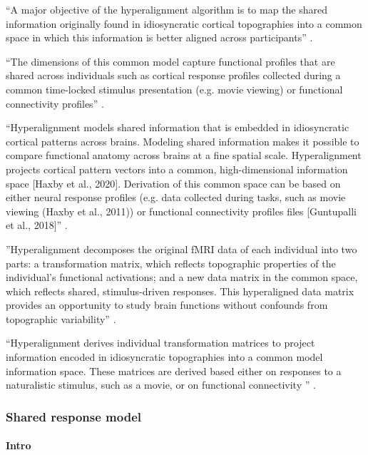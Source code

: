 %
``A major objective of the hyperalignment algorithm is to map the shared
information originally found in idiosyncratic cortical topographies into a
common space in which this information is better aligned across participants''
\citep{busch2021hybrid}.

%
``The dimensions of this common model capture functional profiles that are
shared across individuals such as cortical response profiles collected during a
common time-locked stimulus presentation (e.g. movie viewing) or functional
connectivity profiles'' \citep{busch2021hybrid}.

%
``Hyperalignment models shared information that is embedded in idiosyncratic
cortical patterns across brains. Modeling shared information makes it possible
to compare functional anatomy across brains at a fine spatial scale.
Hyperalignment projects cortical pattern vectors into a common, high-dimensional
information space [Haxby et al., 2020]. Derivation of this common space can be
based on either neural response profiles (e.g. data collected during tasks, such
as movie viewing (Haxby et al., 2011)) or functional connectivity profiles files
[Guntupalli et al., 2018]'' \citep{busch2021hybrid}.

%
''Hyperalignment decomposes the original fMRI data of
each individual into two parts: a transformation matrix, which reflects
topographic properties of the individual's functional activations; and a new
data matrix in the common space, which reflects shared, stimulus-driven
responses. This hyperaligned data matrix provides an opportunity to study brain
functions without confounds from topographic variability''
\citep{feilong2018reliable}.

%
``Hyperalignment derives individual transformation matrices to project
information encoded in idiosyncratic topographies into a common model
information space. These matrices are derived based either on responses to a
naturalistic stimulus, such as a movie, or on functional connectivity
\citep{guntupalli2018computational}'' \citep{jiahui2020predicting}.


\subsubsection{Shared response model}

\paragraph{Intro}

